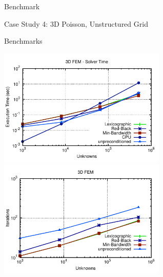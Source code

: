 \begin{frame}{Benchmark}
 \begin{center}
  Case Study 4: 3D Poisson, Unstructured Grid
 \end{center}
\end{frame}

\begin{frame}{Benchmarks}
  \begin{center}
   \vspace*{-0.4cm}
   \includegraphics[width=0.6\textwidth]{figures/fem3d-solver.pdf} \\[-0.2em]
   \includegraphics[width=0.6\textwidth]{figures/fem3d-iters.pdf}
  \end{center}
\end{frame}

